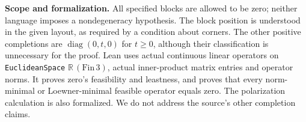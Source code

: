 \documentclass[11pt]{article}
\begin{document}
\noindent\textbf{Scope and formalization.} All specified blocks are allowed to be zero; neither language imposes a nondegeneracy hypothesis. The block position is understood in the given layout, as required by a condition about corners. The other positive completions are $\operatorname{diag}(0,t,0)$ for $t\geq0$, although their classification is unnecessary for the proof. Lean uses actual continuous linear operators on \texttt{EuclideanSpace} $\mathbb R\,(\mathrm{Fin}\,3)$, actual inner-product matrix entries and operator norms. It proves zero's feasibility and leastness, and proves that every norm-minimal or Loewner-minimal feasible operator equals zero. The polarization calculation is also formalized. We do not address the source's other completion claims.
\end{document}
